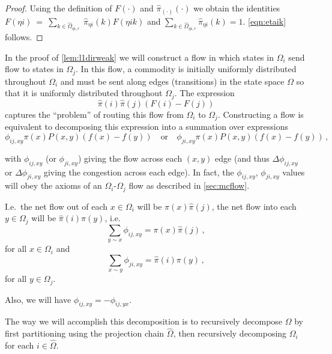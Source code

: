 \documentclass[a4paper, 12p]{article}
\numberwithin{equation}{section}
\newcommand{\FF}{F}
\newcommand{\Omorproj}{\hat{\Omega}}
\newcommand{\piorproj}{\hat{\pi}}
\begin{document}
\begin{proof}
Using the definition of $\FF(\cdot)$ and $\piorproj_{(\cdot)}(\cdot)$ we obtain the identities
$\FF(\eta i)~=~\sum_{k \in \Omorproj_{\eta i, r}}~\piorproj_{\eta i}(k)\FF(\eta i k)$
and $\sum_{k \in \Omorproj_{\eta i, r}} \piorproj_{\eta i}(k) = 1$. \eqref{eqn:etaik} follows.
\end{proof}

In the proof of \cref{lem:l1dirweak} we will construct a flow in which states in $\Omega_i$ send flow to states in $\Omega_j$. In this flow, a commodity is initially uniformly distributed throughout $\Omega_i$ and must be sent along edges (transitions) in the state space $\Omega$ so that it is uniformly distributed throughout $\Omega_j$. The expression
\[
\piorproj(i)\piorproj(j)(\FF(i) - \FF(j))
\]
captures the ``problem'' of routing this flow from $\Omega_i$ to $\Omega_j$. Constructing a flow is equivalent to decomposing this expression into a summation over expressions 
\[\phi_{ij,xy}\pi(x)P(x, y)(f(x) - f(y))\quad\textrm{or}\quad\phi_{ji,xy}\pi(x)P(x, y)(f(x) - f(y))\,,\]

with $\phi_{ij,xy}$ (or $\phi_{ji,xy}$) giving the flow across each $(x,y)$ edge (and thus $\Delta\phi_{ij,xy}$ or $\Delta\phi_{ji,xy}$ giving the congestion across each edge). In fact, the $\phi_{ij,xy}$, $\phi_{ji,xy}$ values will obey the axioms of an $\Omega_i$-$\Omega_j$ flow as described in \cref{sec:mcflow}.

I.e.~the net flow out of each $x \in \Omega_i$ will be $\pi(x)\piorproj(j)$, the net flow into each $y \in \Omega_j$ will be $\piorproj(i)\pi(y)$, i.e.
\[
    \sum_{y \sim x}\phi_{ij,xy} = \pi(x)\piorproj(j)\,,
\]
for all $x \in \Omega_i$
and
\[
    \sum_{x \sim y}\phi_{ji,xy} = \piorproj(i)\pi(y)\,,
\]
for all $y \in \Omega_j$.

Also, we will have $\phi_{ij,xy} = -\phi_{ij,yx}$.


The way we will accomplish this decomposition is to recursively decompose $\Omega$ by first partitioning using the projection chain $\Omorproj$, then recursively decomposing $\Omega_i$ for each $i \in \Omorproj$. 
\end{document}
